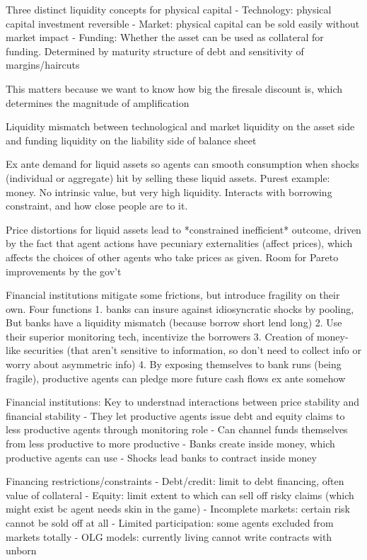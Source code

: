\documentclass[12pt]{article}
\theoremstyle{plain}
\theoremstyle{definition}
\theoremstyle{remark}
\begin{document}
Three distinct liquidity concepts for physical capital
- Technology: physical capital investment reversible
- Market: physical capital can be sold easily without market impact
- Funding: Whether the asset can be used as collateral for funding.
Determined by maturity structure of debt and sensitivity of
margins/haircuts

This matters because we want to know how big the firesale discount is,
which determines the magnitude of amplification

Liquidity mismatch between technological and market liquidity on the
asset side and funding liquidity on the liability side of balance sheet

Ex ante demand for liquid assets so agents can smooth consumption when
shocks (individual or aggregate) hit by selling these liquid assets.
Purest example: money. No intrinsic value, but very high liquidity.
Interacts with borrowing constraint, and how close people are to it.

Price distortions for liquid assets lead to *constrained inefficient*
outcome, driven by the fact that agent actions have pecuniary
externalities (affect prices), which affects the choices of other agents
who take prices as given.
Room for Pareto improvements by the gov't

Financial institutions mitigate some frictions, but introduce fragility
on their own. Four functions
1.  banks can insure against idiosyncratic shocks by pooling,
    But banks have a liquidity mismatch (because borrow short lend long)
2.  Use their superior monitoring tech, incentivize the borrowers
3.  Creation of money-like securities (that aren't sensitive to
    information, so don't need to collect info or worry about asymmetric
    info)
4.  By exposing themselves to bank runs (being fragile), productive
    agents can pledge more future cash flows ex ante somehow

Financial institutions: Key to understnad interactions between price
stability and financial stability
- They let productive agents issue debt and equity claims to less
productive agents through monitoring role
- Can channel funds themselves from less productive to more productive
- Banks create inside money, which productive agents can use
- Shocks lead banks to contract inside money

Financing restrictions/constraints
- Debt/credit: limit to debt financing, often value of collateral
- Equity: limit extent to which can sell off risky claims (which might
exist bc agent needs skin in the game)
- Incomplete markets: certain risk cannot be sold off at all
- Limited participation: some agents excluded from markets totally
- OLG models: currently living cannot write contracts with unborn
\end{document}
